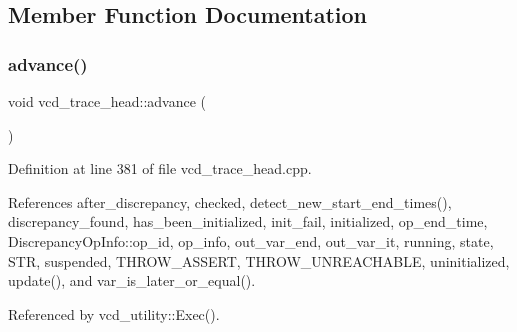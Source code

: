 \subsection{Member Function Documentation}
\mbox{\label{structvcd__trace__head_a20ce69cc689b656626dd0400b8606e95}} 
\subsubsection{\texorpdfstring{advance()}{advance()}}
{\footnotesize\ttfamily void vcd\+\_\+trace\+\_\+head\+::advance (\begin{DoxyParamCaption}{ }\end{DoxyParamCaption})}



Definition at line 381 of file vcd\+\_\+trace\+\_\+head.\+cpp.



References after\+\_\+discrepancy, checked, detect\+\_\+new\+\_\+start\+\_\+end\+\_\+times(), discrepancy\+\_\+found, has\+\_\+been\+\_\+initialized, init\+\_\+fail, initialized, op\+\_\+end\+\_\+time, Discrepancy\+Op\+Info\+::op\+\_\+id, op\+\_\+info, out\+\_\+var\+\_\+end, out\+\_\+var\+\_\+it, running, state, S\+TR, suspended, T\+H\+R\+O\+W\+\_\+\+A\+S\+S\+E\+RT, T\+H\+R\+O\+W\+\_\+\+U\+N\+R\+E\+A\+C\+H\+A\+B\+LE, uninitialized, update(), and var\+\_\+is\+\_\+later\+\_\+or\+\_\+equal().



Referenced by vcd\+\_\+utility\+::\+Exec().

